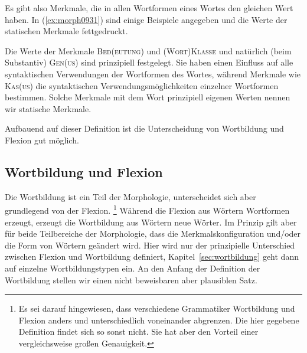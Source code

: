 Es gibt also Merkmale, die in allen Wortformen eines Wortes den gleichen Wert haben.
In (\ref{ex:morph0931}) sind einige Beispiele angegeben und die Werte der statischen Merkmale fettgedruckt.

\begin{exe}
  \ex \label{ex:morph0931}
  \begin{xlist}
  \end{xlist}
\end{exe}

Die Werte der Merkmale \textsc{Bed(eutung)} und \textsc{(Wort)Klasse} und natürlich (beim Substantiv) \textsc{Gen(us)} sind prinzipiell festgelegt.
Sie haben einen Einfluss auf alle syntaktischen Verwendungen der Wortformen des Wortes, während Merkmale wie \textsc{Kas(us)} die syntaktischen Verwendungsmöglichkeiten einzelner Wortformen bestimmen.
Solche Merkmale mit dem Wort prinzipiell eigenen Werten nennen wir statische Merkmale.


Aufbauend auf dieser Definition ist die Unterscheidung von Wortbildung und Flexion gut möglich.

\subsection{Wortbildung und Flexion}

\label{sec:defwb}

Die Wortbildung ist ein Teil der Morphologie, unterscheidet sich aber grundlegend von der Flexion.%
\footnote{Es sei darauf hingewiesen, dass verschiedene Grammatiker Wortbildung und Flexion anders und unterschiedlich voneinander abgrenzen.
Die hier gegebene Definition findet sich so sonst nicht.
Sie hat aber den Vorteil einer vergleichsweise großen Genauigkeit.}
Während die Flexion aus Wörtern Wortformen erzeugt, erzeugt die Wortbildung aus Wörtern neue Wörter.
Im Prinzip gilt aber für beide Teilbereiche der Morphologie, dass die Merkmalskonfiguration und\slash oder die Form von Wörtern geändert wird.
Hier wird nur der prinzipielle Unterschied zwischen Flexion und Wortbildung definiert, Kapitel~\ref{sec:wortbildung} geht dann auf einzelne Wortbildungstypen ein.
An den Anfang der Definition der Wortbildung stellen wir einen nicht beweisbaren aber plausiblen Satz.

